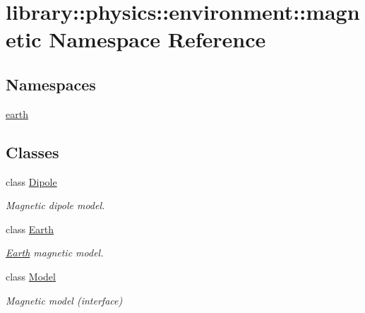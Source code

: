 \hypertarget{namespacelibrary_1_1physics_1_1environment_1_1magnetic}{}\section{library\+:\+:physics\+:\+:environment\+:\+:magnetic Namespace Reference}
\label{namespacelibrary_1_1physics_1_1environment_1_1magnetic}
\subsection*{Namespaces}
\begin{DoxyCompactItemize}
\item 
 \hyperlink{namespacelibrary_1_1physics_1_1environment_1_1magnetic_1_1earth}{earth}
\end{DoxyCompactItemize}
\subsection*{Classes}
\begin{DoxyCompactItemize}
\item 
class \hyperlink{classlibrary_1_1physics_1_1environment_1_1magnetic_1_1_dipole}{Dipole}
\begin{DoxyCompactList}\small\item\em Magnetic dipole model. \end{DoxyCompactList}\item 
class \hyperlink{classlibrary_1_1physics_1_1environment_1_1magnetic_1_1_earth}{Earth}
\begin{DoxyCompactList}\small\item\em \hyperlink{classlibrary_1_1physics_1_1environment_1_1magnetic_1_1_earth}{Earth} magnetic model. \end{DoxyCompactList}\item 
class \hyperlink{classlibrary_1_1physics_1_1environment_1_1magnetic_1_1_model}{Model}
\begin{DoxyCompactList}\small\item\em Magnetic model (interface) \end{DoxyCompactList}\end{DoxyCompactItemize}
